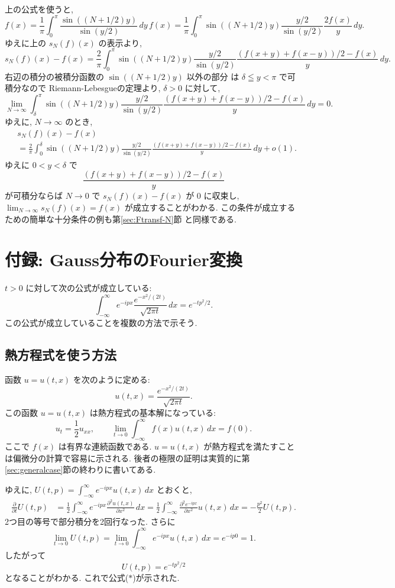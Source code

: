 \documentclass[12pt,twoside]{jarticle}
\renewcommand\d{\partial}
\theoremstyle{jplain}
\theoremstyle{jplain}
\theoremstyle{jplain}
\numberwithin{theorem}{section}
\numberwithin{equation}{section}
\numberwithin{figure}{section}
\numberwithin{table}{section}
\newcommand\secref[1]{第\ref{#1}節}
\begin{document}
上の公式を使うと, 
\[
f(x)
=\frac{1}{\pi}\int_0^{\pi}\frac{\sin((N+1/2)y)}{\sin(y/2)}\,dy\,f(x)
=\frac{1}{\pi}\int_0^{\pi}\sin((N+1/2)y)\frac{y/2}{\sin(y/2)}\frac{2f(x)}{y}\,dy.
\]
ゆえに上の $s_N(f)(x)$ の表示より, 
\[
s_N(f)(x)-f(x)
=\frac{2}{\pi}\int_0^\pi
\sin((N+1/2)y)
\frac{y/2}{\sin(y/2)}\frac{(f(x+y)+f(x-y))/2-f(x)}{y}\,dy.
\]
右辺の積分の被積分函数の $\sin((N+1/2)y)$ 以外の部分
は $\delta\leqq y<\pi$ で可積分なので
Riemann-Lebesgueの定理より, $\delta>0$ に対して, 
\[
\lim_{N\to\infty}
\int_\delta^\pi
\sin((N+1/2)y)
\frac{y/2}{\sin(y/2)}\frac{(f(x+y)+f(x-y))/2-f(x)}{y}\,dy=0.
\]
ゆえに, $N\to\infty$ のとき, 
\begin{align*}
&
s_N(f)(x)-f(x)
\\ &
=\frac{2}{\pi}\int_0^\delta
\sin((N+1/2)y)
\frac{y/2}{\sin(y/2)}\frac{(f(x+y)+f(x-y))/2-f(x)}{y}\,dy + o(1).
\end{align*}
ゆえに $0<y<\delta$ で
\[
\frac{(f(x+y)+f(x-y))/2-f(x)}{y}
\]
が可積分ならば $N\to 0$ で $s_N(f)(x)-f(x)$ が $0$ に収束し, 
$\lim_{N\to\infty}s_N(f)(x)=f(x)$ が成立することがわかる.
この条件が成立するための簡単な十分条件の例も\secref{sec:Ftransf-N}
と同様である.


\section{付録: Gauss分布のFourier変換}
\label{sec:Gauss-Fourier}

$t>0$ に対して次の公式が成立している:
\[
\int_{-\infty}^\infty e^{-ipx} \frac{e^{-x^2/(2t)}}{\sqrt{2\pi t}}\,dx
= e^{-tp^2/2}.
\tag{$*$}
\]
この公式が成立していることを複数の方法で示そう.

\subsection{熱方程式を使う方法}

函数 $u=u(t,x)$ を次のように定める:
\[
u(t,x)
= \frac{e^{-x^2/(2t)}}{\sqrt{2\pi t}}.
\]
この函数 $u=u(t,x)$ は熱方程式の基本解になっている:
\[
u_t = \frac{1}{2}u_{xx}, \qquad
\lim_{t\to 0}\int_{-\infty}^\infty f(x) u(t,x)\,dx=f(0).
\]
ここで $f(x)$ は有界な連続函数である. 
$u=u(t,x)$ が熱方程式を満たすことは偏微分の計算で容易に示される.
後者の極限の証明は実質的に\secref{sec:generalcase}の終わりに書いてある.

ゆえに, $U(t,p)=\int_{-\infty}^\infty e^{-ipx} u(t,x)\,dx$ とおくと, 
\begin{align*}
\frac{\d}{\d t}U(t,p)
&=
\frac{1}{2}
\int_{-\infty}^\infty e^{-ipx} \frac{\d^2 u(t,x)}{\d x^2}\,dx
=
\frac{1}{2}
\int_{-\infty}^\infty \frac{\d^2 e^{-ipx}}{\d x^2}  u(t,x)\,dx
=
-\frac{p^2}{2}U(t,p).
\end{align*}
2つ目の等号で部分積分を2回行なった. さらに
\[
\lim_{t\to 0}U(t,p)
=\lim_{t\to 0} \int_{-\infty}^\infty e^{-ipx} u(t,x)\,dx
=e^{-ip0}
=1.
\]
したがって
\[
U(t,p)=e^{-tp^2/2}
\]
となることがわかる. これで公式($*$)が示された.
\end{document}

